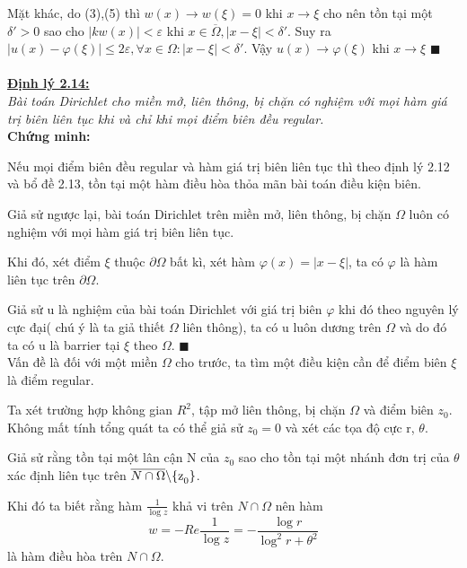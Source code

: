 Mặt khác, do (3),(5) thì $w\left( x \right) \to w\left( \xi  \right) = 0$  khi $x \to \xi $  cho nên tồn tại một $\delta ' > 0$ sao cho $\left| {kw\left( x \right)} \right| < \varepsilon $  khi  $x \in \overline \Omega  ,\left| {x - \xi } \right| < \delta '$.
Suy ra $\left| {u\left( x \right) - \varphi \left( \xi  \right)} \right| \le 2\varepsilon ,\forall x\in \Omega:\left| {x - \xi } \right| < \delta '$.
Vậy $u\left( x \right) \to \varphi \left( \xi  \right)$ khi $x \to \xi$ $\blacksquare$
\\
\\
\textbf{\underline{Định lý 2.14:}}
\\
\textit{
Bài toán Dirichlet cho miền mở, liên thông, bị chặn
có nghiệm với mọi hàm giá trị biên liên tục khi và chỉ khi mọi điểm biên đều regular.
}
\\
\textbf{Chứng minh:}

Nếu mọi điểm biên đều regular và hàm giá trị biên liên tục thì theo định lý 2.12 và
bổ đề 2.13, tồn tại một hàm điều hòa thỏa mãn bài toán điều kiện biên.

Giả sử ngược lại, bài toán Dirichlet trên miền mở, liên thông, bị chặn $\Omega$ luôn có nghiệm với mọi hàm giá trị biên liên tục.

Khi đó, xét điểm $\xi$ thuộc $\partial \Omega$ bất kì, xét hàm  $\varphi \left( x \right) = \left| {x - \xi } \right|$, ta có $\varphi$ là hàm liên tục trên $\partial \Omega$.

Giả sử u là nghiệm của bài toán Dirichlet với giá trị biên $\varphi$ khi đó theo nguyên lý cực đại( chú ý là ta giả thiết $\Omega$ liên thông), ta có u luôn dương trên $\Omega$ và do đó ta có u là barrier tại $\xi$ theo $\Omega$. $\blacksquare$
\\

Vấn đề là đối với một miền $\Omega$ cho trước, ta tìm một điều kiện cần để điểm biên $\xi$ là điểm regular.

Ta xét trường hợp không gian $R^2$, tập mở liên thông, bị chặn $\Omega$ và điểm biên $z_0$. Không mất tính tổng quát ta có thể giả sử $z_0 = 0$ và xét các tọa độ cực r, $\theta$.

Giả sử rằng tồn tại một lân cận N của $z_0$ sao cho tồn tại một nhánh đơn trị của $\theta$ xác định liên tục trên $\overline {N \cap \Omega } \backslash {\rm{\{ z}}_{\rm{0}} {\rm{\} }}$.

Khi đó ta biết rằng hàm $\frac{1}{{\log z}} $ khả vi trên $N \cap \Omega$ nên hàm 
\[
w =  - Re\frac{1}{{\log z}} =  - \frac{{\log r}}{{\log ^2 r + \theta ^2 }}
\]
là hàm điều hòa trên $N \cap \Omega$.

